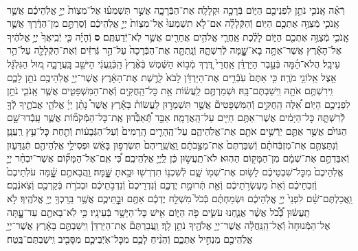 \documentclass[twoside, openany, parskip=half, 11pt]{book}
\begin{document}
\begin{footnotesize}
\begin{multicols}{2}
\\
רְֿאֵ֗ה אָֽנֹכִ֛י נֹתֵ֥ן לִפְנֵיכֶ֖ם הַיּ֑וֹם בְּֿרָכָ֖ה וּקְלָלָֽה׃ אֶת־הַבְּֿרָכָ֑ה אֲשֶׁ֣ר תִּשְׁמְע֗וּ אֶל־מִצְוֹת֙ יְיָ֣ אֱלֹֽהֵיכֶ֔ם אֲשֶׁ֧ר אָֽנֹכִ֛י מְֿצַוֶּ֥ה אֶתְכֶ֖ם הַיּֽוֹם׃ וְֿהַקְּֿלָלָ֗ה אִם־לֹ֤א תִשְׁמְעוּ֙ אֶל־מִצְוֹת֙ יְיָ֣ אֱלֹֽהֵיכֶ֔ם וְֿסַרְתֶּ֣ם מִן־הַדֶּ֔רֶךְ אֲשֶׁ֧ר אָֽנֹכִ֛י מְֿצַוֶּ֥ה אֶתְכֶ֖ם הַיּ֑וֹם לָלֶ֗כֶת אַֽחֲרֵ֛י אֱלֹהִ֥ים אֲחֵרִ֖ים אֲשֶׁ֥ר לֹֽא־יְֿדַעְתֶּֽם׃ \textbf{ס} וְֿהָיָ֗ה כִּ֤י יְֿבִֽיאֲךָ֙ יְיָ֣ אֱלֹהֶ֔יךָ אֶל־הָאָ֕רֶץ אֲשֶׁר־אַתָּ֥ה בָא־שׇׇׇָׁ֖מָּה לְֿרִשְׁתָּ֑הּ וְֿנָֽתַתָּ֤ה אֶת־הַבְּֿרָכָה֙ עַל־הַ֣ר גְּֿרִזִּ֔ים וְֿאֶת־הַקְּֿלָלָ֖ה עַל־הַ֥ר עֵיבָֽל׃ הֲלֹא־הֵ֜מָּה בְּֿעֵ֣בֶר הַיַּרְדֵּ֗ן אַֽחֲרֵי֙ דֶּ֚רֶךְ מְֿב֣וֹא הַשֶּׁ֔מֶשׁ בְּֿאֶ֨רֶץ֙ הַֽכְּֿנַֽעֲנִ֔י הַיּשֵׁ֖ב בָּֽעֲרָבָ֑ה מ֚וּל הַגִּלְגָּ֔ל אֵ֖צֶל אֵֽלוֹנֵ֥י מֹרֶֽה׃ כִּ֤י אַתֶּם֙ עֹֽבְֿרִ֣ים אֶת־הַיַּרְדֵּ֔ן לָבֹא֙ לָרֶ֣שֶׁת אֶת־הָאָ֔רֶץ אֲשֶׁר־יְיָ֥ אֱלֹֽהֵיכֶ֖ם נֹתֵ֣ן לָכֶ֑ם וִֽירִשְׁתֶּ֥ם אֹתָ֖הּ וִֽישַׁבְתֶּם־בָּֽהּ׃
וּשְׁמַרְתֶּ֣ם לַֽעֲשׂ֔וֹת אֵ֥ת כׇּל־הַֽחֻקִּ֖ים וְֿאֶת־הַמִּשְׁפָּטִ֑ים אֲשֶׁ֧ר אָֽנֹכִ֛י נֹתֵ֥ן לִפְנֵיכֶ֖ם הַיּֽוֹם׃
אֵ֠לֶּה הַֽחֻקִּ֣ים וְֿהַמִּשְׁפָּטִים֘ אֲשֶׁ֣ר תִּשְׁמְר֣וּן לַֽעֲשׂוֹת֒ בָּאָ֕רֶץ אֲשֶׁר֩ נָתַ֨ן יְיָ֜ אֱלֹהֵ֧י אֲבֹתֶ֛יךָ לְֿךָ֖ לְֿרִשְׁתָּ֑הּ כׇּל־הַיָּמִ֔ים אֲשֶׁר־אַתֶּ֥ם חַיִּ֖ים עַל־הָֽאֲדָמָֽה׃ אַבֵּ֣ד תְּֿ֠אַבְּֿד֠וּן אֶֽת־כׇּל־הַמְּֿקֹמ֞וֹת אֲשֶׁ֧ר עָֽבְֿדוּ־שָׁ֣ם הַגּוֹיִ֗ם אֲשֶׁ֥ר אַתֶּ֛ם יֹֽרְֿשִׁ֥ים אֹתָ֖ם אֶת־אֱלֹֽהֵיהֶ֑ם עַל־הֶֽהָרִ֤ים הָֽרָמִים֙ וְֿעַל־הַגְּֿבָע֔וֹת וְֿתַ֖חַת כׇּל־עֵ֥ץ רַֽעֲנָֽן׃ וְֿנִתַּצְתֶּ֣ם אֶת־מִזְבְּֿחֹתָ֗ם וְֿשִׁבַּרְתֶּם֙ אֶת־מַצֵּ֣בֹתָ֔ם וַֽאֲשֵֽׁרֵיהֶם֙ תִּשְׂרְפ֣וּן בָּאֵ֔שׁ וּפְסִילֵ֥י אֱלֹֽהֵיהֶ֖ם תְּֿגַדֵּע֑וּן וְֿאִבַּדְתֶּ֣ם אֶת־שְׁמָ֔ם מִן־הַמָּק֖וֹם הַהֽוּא׃ לֹא־תַֽעֲשׂ֣וּן כֵּ֔ן לַֽיְיָ֖ אֱלֹֽהֵיכֶֽם׃ כִּ֠י אִֽם־אֶל־הַמָּק֞וֹם אֲשֶׁר־יִבְחַ֨ר יְיָ֤ אֱלֹֽהֵיכֶם֙ מִכׇּל־שִׁבְטֵיכֶ֔ם לָשׂ֥וּם אֶת־שְׁמ֖וֹ שָׁ֑ם לְֿשִׁכְנ֥וֹ תִדְרְשׁ֖וּ וּבָ֥אתָ שׇׇׇׇָּֽׁמָּה׃  וַֽהֲבֵאתֶ֣ם שׇׇׇָׁ֗מָּה עֹלֹֽתֵיכֶם֙ וְֿזִבְחֵיכֶ֔ם וְֿאֵת֙ מַעְשְׂרֹ֣תֵיכֶ֔ם וְֿאֵ֖ת תְּֿרוּמַ֣ת יֶדְכֶ֑ם וְֿנִדְרֵיכֶם֙ וְֿנִדְבֹ֣תֵיכֶ֔ם וּבְכֹרֹ֥ת בְּֿקַרְכֶ֖ם וְֿצֹֽאנְֿכֶֽם׃ וַֽאֲכַלְתֶּם־שָׁ֗ם לִפְנֵי֙ יְיָ֣ אֱלֹֽהֵיכֶ֔ם וּשְׂמַחְתֶּ֗ם בְּֿכֹל֙ מִשְׁלַ֣ח יֶדְכֶ֔ם אַתֶּ֖ם וּבׇׇׇׇׇׇׇָֽתֵּיכֶ֑ם אֲשֶׁ֥ר בֵּֽרַכְךָ֖ יְיָ֥ אֱלֹהֶֽיךָ׃ לֹ֣א תַֽעֲשׂ֔וּן כְּֿ֠כֹ֠ל אֲשֶׁ֨ר אֲנַ֧חְנוּ עֹשִׂ֛ים פֹּ֖ה הַיּ֑וֹם אִ֖ישׁ כׇּל־הַיָּשָׁ֥ר בְּֿעֵינָֽיו׃ כִּ֥י לֹֽא־בָאתֶ֖ם עַד־עׇׇׇָ֑תָּה אֶל־הַמְּֿנוּחָה֙ וְֿאֶל־הַֽנַּֽחֲלָ֔ה אֲשֶׁר־יְיָ֥ אֱלֹהֶ֖יךָ נֹתֵ֥ן לָֽךְ׃ וַֽעֲבַרְתֶּם֘ אֶת־הַיַּרְדֵּן֒ וִֽישַׁבְתֶּ֣ם בָּאָ֔רֶץ אֲשֶׁר־יְיָ֥ אֱלֹֽהֵיכֶ֖ם מַנְחִ֣יל אֶתְכֶ֑ם וְֿהֵנִ֨יחַ לָכֶ֧ם מִכׇּל־אֹֽיְֿבֵיכֶ֛ם מִסָּבִ֖יב וִֽישַׁבְתֶּם־בֶּֽטַח׃


\end{multicols}
\end{footnotesize}
\end{document}
